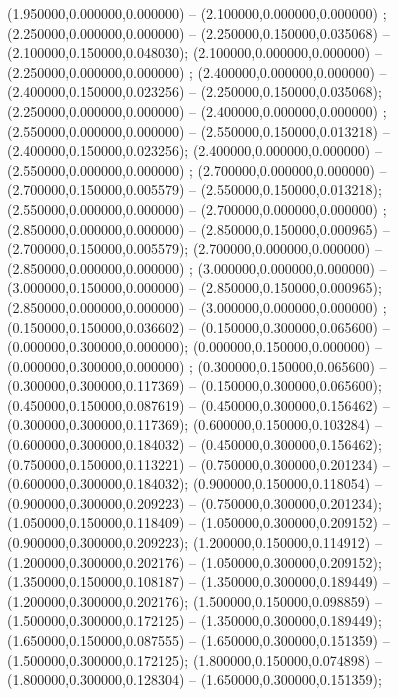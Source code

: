  (1.950000,0.000000,0.000000) -- (2.100000,0.000000,0.000000) ;
 (2.250000,0.000000,0.000000) -- (2.250000,0.150000,0.035068) -- (2.100000,0.150000,0.048030);
 (2.100000,0.000000,0.000000) -- (2.250000,0.000000,0.000000) ;
 (2.400000,0.000000,0.000000) -- (2.400000,0.150000,0.023256) -- (2.250000,0.150000,0.035068);
 (2.250000,0.000000,0.000000) -- (2.400000,0.000000,0.000000) ;
 (2.550000,0.000000,0.000000) -- (2.550000,0.150000,0.013218) -- (2.400000,0.150000,0.023256);
 (2.400000,0.000000,0.000000) -- (2.550000,0.000000,0.000000) ;
 (2.700000,0.000000,0.000000) -- (2.700000,0.150000,0.005579) -- (2.550000,0.150000,0.013218);
 (2.550000,0.000000,0.000000) -- (2.700000,0.000000,0.000000) ;
 (2.850000,0.000000,0.000000) -- (2.850000,0.150000,0.000965) -- (2.700000,0.150000,0.005579);
 (2.700000,0.000000,0.000000) -- (2.850000,0.000000,0.000000) ;
 (3.000000,0.000000,0.000000) -- (3.000000,0.150000,0.000000) -- (2.850000,0.150000,0.000965);
 (2.850000,0.000000,0.000000) -- (3.000000,0.000000,0.000000) ;
 (0.150000,0.150000,0.036602) -- (0.150000,0.300000,0.065600) -- (0.000000,0.300000,0.000000);
 (0.000000,0.150000,0.000000) -- (0.000000,0.300000,0.000000) ;
 (0.300000,0.150000,0.065600) -- (0.300000,0.300000,0.117369) -- (0.150000,0.300000,0.065600);
 (0.450000,0.150000,0.087619) -- (0.450000,0.300000,0.156462) -- (0.300000,0.300000,0.117369);
 (0.600000,0.150000,0.103284) -- (0.600000,0.300000,0.184032) -- (0.450000,0.300000,0.156462);
 (0.750000,0.150000,0.113221) -- (0.750000,0.300000,0.201234) -- (0.600000,0.300000,0.184032);
 (0.900000,0.150000,0.118054) -- (0.900000,0.300000,0.209223) -- (0.750000,0.300000,0.201234);
 (1.050000,0.150000,0.118409) -- (1.050000,0.300000,0.209152) -- (0.900000,0.300000,0.209223);
 (1.200000,0.150000,0.114912) -- (1.200000,0.300000,0.202176) -- (1.050000,0.300000,0.209152);
 (1.350000,0.150000,0.108187) -- (1.350000,0.300000,0.189449) -- (1.200000,0.300000,0.202176);
 (1.500000,0.150000,0.098859) -- (1.500000,0.300000,0.172125) -- (1.350000,0.300000,0.189449);
 (1.650000,0.150000,0.087555) -- (1.650000,0.300000,0.151359) -- (1.500000,0.300000,0.172125);
 (1.800000,0.150000,0.074898) -- (1.800000,0.300000,0.128304) -- (1.650000,0.300000,0.151359);
